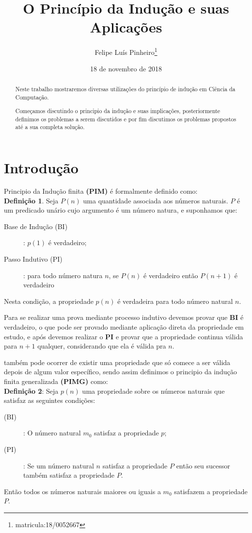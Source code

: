 \documentclass[a4paper, 10pt]{article}
\title{\LARGE \bf O Princípio da Indução e suas Aplicações }
\author{Felipe Luís Pinheiro\footnote{matricula:18/0052667}}
\date{ 18 de novembro de 2018}
\begin{document}
\maketitle

\begin{abstract}

Neste trabalho mostraremos diversas utilizações do princípio de indução em Ciência da Computação.

Começamos discutindo o principio da indução e suas implicações, posteriormente definimos os problemas a serem discutidos e por fim discutimos os problemas propostos até a sua completa solução.

\end{abstract}

\section{Introdução}

Principio da Indução finita \textbf{(PIM)}  é formalmente definido como:\\
\textbf{Definição 1}. Seja $P(n)$ uma quantidade associada aos números naturais. $P$ é um predicado unário cujo argumento é um número natura, e suponhamos que:
\begin{description}
	\item[Base de Indução (BI)]:  $p(1)$ é verdadeiro;
	\item[Passo Indutivo (PI)]:  para todo número natura $n$, se $P(n)$ é verdadeiro então $P(n+1)$ é verdadeiro
\end{description}
Nesta condição, a propriedade $p(n)$ é verdadeira para todo número natural $n$.

Para se realizar uma prova mediante processo indutivo devemos provar que \textbf{BI} é verdadeiro, o que pode ser provado mediante aplicação direta da propriedade em estudo, e após devemos realizar o \textbf{PI} e provar que a propriedade continua válida para $n+1$ qualquer, considerando que ela é válida pra $n$.

também pode ocorrer de existir uma propriedade que só comece a ser válida depois de algum valor específico, sendo assim definimos o principio da indução finita generalizada \textbf{(PIMG)}  como:\\
\textbf{Definição 2}: Seja $p(n)$ uma propriedade sobre os números naturais que satisfaz as seguintes condições: 
\begin{description}
	\item[(BI)]: O número natural $m_0$ satisfaz a propriedade $p$;
	\item[(PI)]: Se um número natural $n$ satisfaz a propriedade $P$ então seu sucessor também satisfaz a propriedade $P$.
\end{description}
Então todos os números naturais maiores ou iguais a $m_0$ satisfazem a propriedade $P$.
\end{document}
